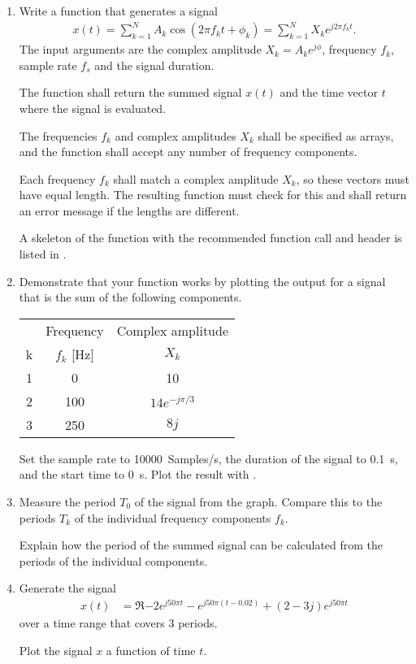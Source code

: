 \begin{enumerate}[1)]
	\item Write a function that generates a signal
	\begin{align}
		x(t)= \sum_{k=1}^{N} A_k \cos(2\pi f_k t + \phi_k) =\sum_{k=1}^{N} X_k e^{j2\pi f_k t}.
	\end{align}
	The input arguments are the complex amplitude $X_k=A_k e^{j\phi}$, frequency $f_k$, sample rate $f_s$ and the signal duration.
	
	The function shall return the summed signal $x(t)$ and the time vector $t$ where the signal is evaluated.
	
	The frequencies $f_k$ and complex amplitudes $X_k$ shall be specified as \numpy arrays, and the function shall accept any number of frequency components. 
	
	Each frequency $f_k$ shall match a complex amplitude $X_k$, so these vectors must have equal length. The resulting function must check for this and shall return an error message if the lengths are different. 
	
	A skeleton of the function with the recommended function call and header is listed in . 
		
	\item Demonstrate that your function works by plotting the output for a signal that is the sum of the following components.
	\begin{center}
		\begin{tabular}{ccc}
				&	Frequency	& Complex amplitude	\\
			k	&	$f_k$ [Hz]		& $X_k$  			\\
			\hline
			1	&	\num{0}		& \num{10}				\\
			2	&	\num{100}	& $14e^{-j\pi/3}$		\\
			3	&	\num{250}	& 	$8j$				\\
		\hline
		\end{tabular}
	\end{center}
	Set the sample rate to \qty{10000}{Samples/s}, the duration of the signal to \qty{0.1}{s}, and the start time to \qty{0}{s}. Plot the result with \matplotlib.
	
	\item Measure the period $T_0 $ of the signal from the graph. Compare this to the periods $T_k$ of the individual frequency components $f_k$.
	
	Explain how the period of the summed signal can be calculated from the periods of the individual components.
	
	\item Generate the signal
	\begin{align*}
		x(t) &= \Re{-2e^{j50\pi t} - e^{j50\pi(t-0.02)} +(2-3j)e^{j50\pi t}   } 
	\end{align*}
	over a time range that covers 3 periods. 
	
	Plot the signal $x$ a function of time $t$.

\end{enumerate}

